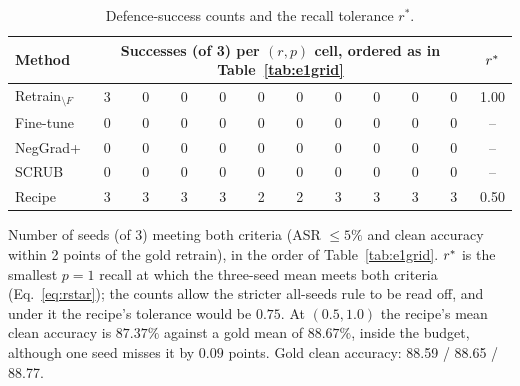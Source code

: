 \begin{table}[t]
\centering
\caption{Defence-success counts and the recall tolerance $r^{*}$.}
\label{tab:success}
\scriptsize
\begin{tabular}{lccccccccccc}
\toprule
\textbf{Method} & \multicolumn{10}{c}{\textbf{Successes (of 3) per $(r,p)$ cell, ordered as in Table~\ref{tab:e1grid}}} & \textbf{$r^{\ast}$} \\
\midrule
Retrain$_{\setminus F}$ & 3 & 0 & 0 & 0 & 0 & 0 & 0 & 0 & 0 & 0 & 1.00 \\
Fine-tune & 0 & 0 & 0 & 0 & 0 & 0 & 0 & 0 & 0 & 0 & -- \\
NegGrad+ & 0 & 0 & 0 & 0 & 0 & 0 & 0 & 0 & 0 & 0 & -- \\
SCRUB & 0 & 0 & 0 & 0 & 0 & 0 & 0 & 0 & 0 & 0 & -- \\
Recipe & 3 & 3 & 3 & 3 & 2 & 2 & 3 & 3 & 3 & 3 & 0.50 \\
\bottomrule
\end{tabular}
\par\vspace{1pt}\scriptsize\raggedright Number of seeds (of 3) meeting both criteria (ASR $\leq5\%$ and clean accuracy within 2 points of the gold retrain), in the order of Table~\ref{tab:e1grid}. $r^{\ast}$ is the smallest $p{=}1$ recall at which the three-seed mean meets both criteria (Eq.~\eqref{eq:rstar}); the counts allow the stricter all-seeds rule to be read off, and under it the recipe's tolerance would be $0.75$. At $(0.5,1.0)$ the recipe's mean clean accuracy is $87.37\%$ against a gold mean of $88.67\%$, inside the budget, although one seed misses it by $0.09$ points. Gold clean accuracy: 88.59 / 88.65 / 88.77.
\end{table}
